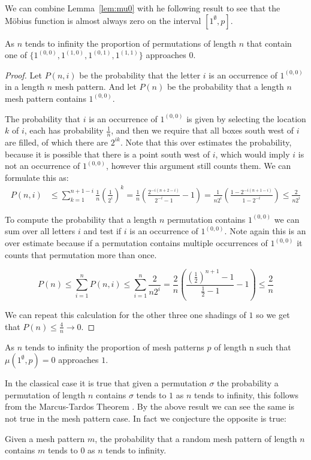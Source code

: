 \documentclass[11pt,a4paper,oneside]{article}
\begin{document}
We can combine Lemma~\ref{lem:mu0} with he following result to see that the
M\"obius function is almost always zero on the interval $[1^\emptyset,p]$.

\begin{lem}
As $n$ tends to infinity the proportion of permutations of length $n$ that contain one of
$\{1^{(0,0)},1^{(1,0)},1^{(0,1)},1^{(1,1)}\}$ approaches $0$.
\begin{proof}
Let $P(n,i)$ be the probability that the letter $i$ is an occurrence of
$1^{(0,0)}$ in a length $n$ mesh pattern. And let $P(n)$ be the probability
that a length $n$ mesh pattern contains $1^{(0,0)}$.

The probability that $i$ is an occurrence of $1^{(0,0)}$ is given by selecting
the location $k$ of $i$, each has probability $\frac{1}{n}$, and then we require
that all boxes south west of $i$ are filled, of which there are $2^{ik}$. Note
that this over estimates the probability, because it is possible that there is a
point south west of $i$, which would imply $i$ is not an occurrence of
$1^{(0,0)}$, however this argument still counts them. We can formulate this as:
\begin{align*}
P(n,i)&\le\sum_{k=1}^{n+1-i}\frac{1}{n}\left(\frac{1}{2^i}\right)^k
=\frac{1}{n}\left(\frac{2^{-i(n+2-i)}}{2^{-i}-1}-1\right)
=\frac{1}{n2^i}\left(\frac{1-2^{-i(n+1-i)}}{1-2^{-i}}\right)
\le\frac{2}{n2^i}
\end{align*}

To compute the probability that a length $n$ permutation contains $1^{(0,0)}$ we
can sum over all letters $i$ and test if $i$ is an occurrence of $1^{(0,0)}$.
Note again this is an over estimate because if a permutation contains multiple
occurrences of $1^{(0,0)}$ it counts that permutation more than once.

$$
P(n)\le\sum_{i=1}^{n}P(n,i)\le\sum_{i=1}^{n}\frac{2}{n2^i}
=\frac{2}{n}\left(\frac{\left(\frac{1}{2}\right)^{n+1}-1}{\frac{1}{2}-1}-1\right)
\le\frac{2}{n}
$$

We can repeat this calculation for the other three one shadings of $1$ so we get
that $P(n)\le \frac{4}{n}\rightarrow 0$.
\end{proof}
\end{lem}
\begin{cor}
As $n$ tends to infinity the proportion of mesh patterns $p$ of length n such
that $\mu(1^\emptyset,p)=0$ approaches $1$.
\end{cor}


In the classical case it is true that given a permutation $\sigma$ the
probability a permutation of length $n$ contains $\sigma$ tends to $1$ as $n$
tends to infinity, this follows from the Marcus-Tardos Theorem \cite{MT04}. By
the above result we can see the same is not true in the mesh pattern case. In
fact we conjecture the opposite is true:
\begin{conj}
Given a mesh pattern $m$, the probability that a random mesh pattern of length
$n$ contains $m$ tends to $0$ as $n$ tends to infinity.
\end{conj}
\end{document}
